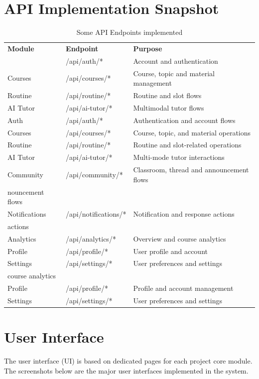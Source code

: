 \section{API Implementation Snapshot}
\begin{table}[H]
	\centering
	\caption{Some API Endpoints implemented}
	\begin{tabular}{p{1.5in}p{2.5in}p{2.0in}}
		\toprule
		\textbf{Module} & \textbf{Endpoint} & \textbf{Purpose} \\
		\midruleAuth & /api/auth/* & Account and authentication \\Courses & /api/courses/* & Course, topic and material management \\Routine & /api/routine/* & Routine and slot flows \\AI Tutor & /api/ai-tutor/* & Multimodal tutor flows \\
		Auth          & /api/auth/*                     & Authentication and account flows \\
		Courses       & /api/courses/*                  & Course, topic, and material operations \\
		Routine       & /api/routine/*                  & Routine and slot-related operations \\
		AI Tutor      & /api/ai-tutor/*                 & Multi-mode tutor interactions \\
		Community & /api/community/* & Classroom, thread and announcement flows \\nouncement flows \\
		Notifications & /api/notifications/* & Notification and response actions \\ actions \\
		Analytics & /api/analytics/* & Overview and course analytics \\Profile & /api/profile/* & User profile and account \\Settings & /api/settings/* & User preferences and settings \\course analytics \\
		Profile       & /api/profile/*                  & Profile and account management \\
		Settings      & /api/settings/*                 & User preferences and settings \\
		\bottomrule
	\end{tabular}
\end{table}

\section{User Interface}
The user interface (UI) is based on dedicated pages for each project core module. The screenshots below are the major
user interfaces implemented in the system.

